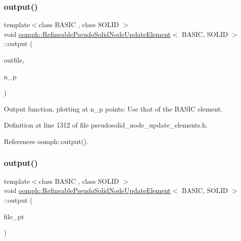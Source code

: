 \subsubsection{\texorpdfstring{output()}{output()}\hspace{0.1cm}{\footnotesize\ttfamily [2/4]}}
{\footnotesize\ttfamily template$<$class B\+A\+S\+IC , class S\+O\+L\+ID $>$ \\
void \hyperlink{classoomph_1_1RefineablePseudoSolidNodeUpdateElement}{oomph\+::\+Refineable\+Pseudo\+Solid\+Node\+Update\+Element}$<$ B\+A\+S\+IC, S\+O\+L\+ID $>$\+::output (\begin{DoxyParamCaption}\item[{std\+::ostream \&}]{outfile,  }\item[{const unsigned \&}]{n\+\_\+p }\end{DoxyParamCaption})\hspace{0.3cm}{\ttfamily [inline]}}



Output function, plotting at n\+\_\+p points\+: Use that of the B\+A\+S\+IC element. 



Definition at line 1312 of file pseudosolid\+\_\+node\+\_\+update\+\_\+elements.\+h.



References oomph\+::output().

\mbox{\label{classoomph_1_1RefineablePseudoSolidNodeUpdateElement_a1fc357bd2adafd81683163f42e2dfd61}} 
\subsubsection{\texorpdfstring{output()}{output()}\hspace{0.1cm}{\footnotesize\ttfamily [3/4]}}
{\footnotesize\ttfamily template$<$class B\+A\+S\+IC , class S\+O\+L\+ID $>$ \\
void \hyperlink{classoomph_1_1RefineablePseudoSolidNodeUpdateElement}{oomph\+::\+Refineable\+Pseudo\+Solid\+Node\+Update\+Element}$<$ B\+A\+S\+IC, S\+O\+L\+ID $>$\+::output (\begin{DoxyParamCaption}\item[{F\+I\+LE $\ast$}]{file\+\_\+pt }\end{DoxyParamCaption})\hspace{0.3cm}{\ttfamily [inline]}}



